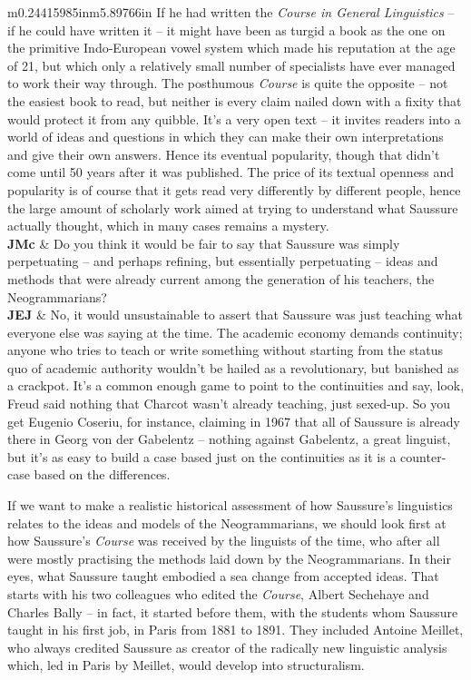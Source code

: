\documentclass[12pt]{article}
\begin{document}
\begin{flushleft}
\begin{supertabular}{m{0.24415985in}m{5.89766in}}
If he had written the \textit{Course in General Linguistics} – if he could have written it – it might have been as turgid a book as the one on the primitive Indo-European vowel system which made his reputation at the age of 21, but which only a relatively small number of specialists have ever managed to work their way through. The posthumous \textit{Course} is quite the opposite – not the easiest book to read, but neither is every claim nailed down with a fixity that would protect it from any quibble. It’s a very open text – it invites readers into a world of ideas and questions in which they can make their own interpretations and give their own answers. Hence its eventual popularity, though that didn’t come until 50 years after it was published. The price of its textual openness and popularity is of course that it gets read very differently by different people, hence the large amount of scholarly work aimed at trying to understand what Saussure actually thought, which in many cases remains a mystery.\\
\textbf{JMc}\newline
 &
Do you think it would be fair to say that Saussure was simply perpetuating – and perhaps refining, but essentially perpetuating – ideas and methods that were already current among the generation of his teachers, the Neogrammarians?\\
\textbf{JEJ}\newline
 &
No, it would unsustainable to assert that Saussure was just teaching what everyone else was saying at the time. The academic economy demands continuity; anyone who tries to teach or write something without starting from the status quo of academic authority wouldn’t be hailed as a revolutionary, but banished as a crackpot. It’s a common enough game to point to the continuities and say, look, Freud said nothing that Charcot wasn’t already teaching, just sexed-up. So you get Eugenio Coseriu, for instance, claiming in 1967 that all of Saussure is already there in Georg von der Gabelentz – nothing against Gabelentz, a great linguist, but it’s as easy to build a case based just on the continuities as it is a counter-case based on the differences. 

If we want to make a realistic historical assessment of how Saussure’s linguistics relates to the ideas and models of the Neogrammarians, we should look first at how Saussure’s \textit{Course} was received by the linguists of the time, who after all were mostly practising the methods laid down by the Neogrammarians. In their eyes, what Saussure taught embodied a sea change from accepted ideas. That starts with his two colleagues who edited the \textit{Course}, Albert Sechehaye and Charles Bally – in fact, it started before them, with the students whom Saussure taught in his first job, in Paris from 1881 to 1891. They included Antoine Meillet, who always credited Saussure as creator of the radically new linguistic analysis which, led in Paris by Meillet, would develop into structuralism. 


\end{supertabular}
\end{flushleft}
\end{document}
